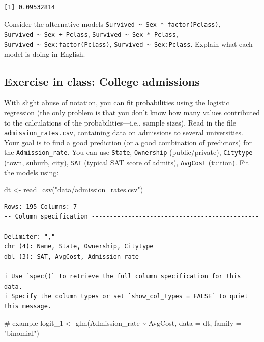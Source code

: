 \documentclass[
  letterpaper,
  DIV=11,
  numbers=noendperiod]{scrreprt}
\newenvironment{Shaded}{\begin{snugshade}}{\end{snugshade}}
\newcommand{\AttributeTok}[1]{\textcolor[rgb]{0.40,0.45,0.13}{#1}}
\newcommand{\CommentTok}[1]{\textcolor[rgb]{0.37,0.37,0.37}{#1}}
\newcommand{\FunctionTok}[1]{\textcolor[rgb]{0.28,0.35,0.67}{#1}}
\newcommand{\NormalTok}[1]{\textcolor[rgb]{0.00,0.23,0.31}{#1}}
\newcommand{\OtherTok}[1]{\textcolor[rgb]{0.00,0.23,0.31}{#1}}
\newcommand{\SpecialCharTok}[1]{\textcolor[rgb]{0.37,0.37,0.37}{#1}}
\newcommand{\StringTok}[1]{\textcolor[rgb]{0.13,0.47,0.30}{#1}}
\begin{document}
\begin{verbatim}
[1] 0.09532814
\end{verbatim}

Consider the alternative models
\texttt{Survived\ \textasciitilde{}\ Sex\ *\ factor(Pclass)},
\texttt{Survived\ \textasciitilde{}\ Sex\ +\ Pclass},
\texttt{Survived\ \textasciitilde{}\ Sex\ *\ Pclass},
\texttt{Survived\ \textasciitilde{}\ Sex:factor(Pclass)},
\texttt{Survived\ \textasciitilde{}\ Sex:Pclass}. Explain what each
model is doing in English.

\hypertarget{exercise-in-class-college-admissions}{%
\subsection{Exercise in class: College
admissions}\label{exercise-in-class-college-admissions}}

With slight abuse of notation, you can fit probabilities using the
logistic regression (the only problem is that you don't know how many
values contributed to the calculations of the probabilities---i.e.,
sample sizes). Read in the file \texttt{admission\_rates.csv},
containing data on admissions to several universities. Your goal is to
find a good prediction (or a good combination of predictors) for the
\texttt{Admission\_rate}. You can use \texttt{State}, \texttt{Ownership}
(public/private), \texttt{Citytype} (town, suburb, city), \texttt{SAT}
(typical SAT score of admits), \texttt{AvgCost} (tuition). Fit the
models using:

\begin{Shaded}
\begin{Highlighting}[]
\NormalTok{dt }\OtherTok{\textless{}{-}} \FunctionTok{read\_csv}\NormalTok{(}\StringTok{"data/admission\_rates.csv"}\NormalTok{)}
\end{Highlighting}
\end{Shaded}

\begin{verbatim}
Rows: 195 Columns: 7
-- Column specification --------------------------------------------------------
Delimiter: ","
chr (4): Name, State, Ownership, Citytype
dbl (3): SAT, AvgCost, Admission_rate

i Use `spec()` to retrieve the full column specification for this data.
i Specify the column types or set `show_col_types = FALSE` to quiet this message.
\end{verbatim}

\begin{Shaded}
\begin{Highlighting}[]
\CommentTok{\# example}
\NormalTok{logit\_1 }\OtherTok{\textless{}{-}} \FunctionTok{glm}\NormalTok{(Admission\_rate }\SpecialCharTok{\textasciitilde{}}\NormalTok{ AvgCost, }\AttributeTok{data =}\NormalTok{ dt, }\AttributeTok{family =} \StringTok{"binomial"}\NormalTok{)}
\end{Highlighting}
\end{Shaded}
\end{document}
